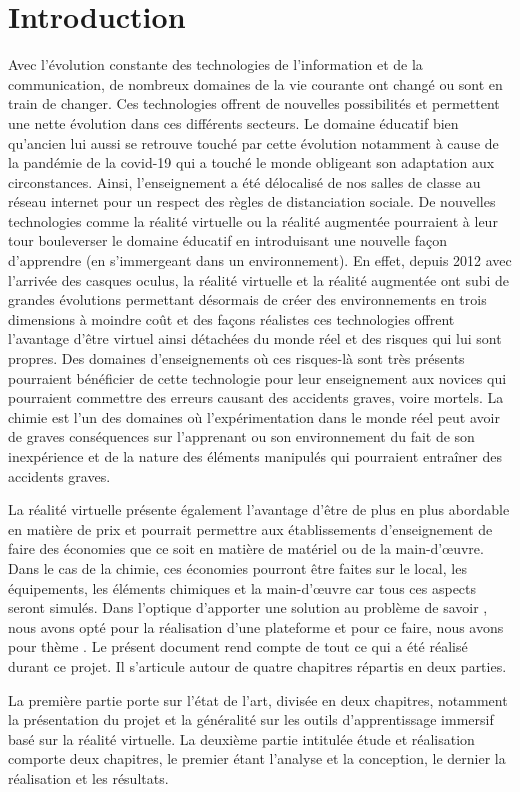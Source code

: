 \chapter*{Introduction}         %

Avec l’évolution constante des technologies de l’information et de la communication, de nombreux domaines de la vie courante ont changé ou sont en train de changer. 
Ces technologies offrent de nouvelles possibilités et permettent une nette évolution dans ces différents secteurs. 
Le domaine éducatif bien qu’ancien lui aussi se retrouve touché par cette évolution notamment à cause de la pandémie de la covid-19 qui a touché le monde obligeant son adaptation aux circonstances. 
Ainsi, l’enseignement a été délocalisé de nos salles de classe au réseau internet pour un respect des règles de distanciation sociale. 
De nouvelles technologies comme la réalité virtuelle ou la réalité augmentée pourraient à leur tour bouleverser le domaine éducatif en introduisant une nouvelle façon d’apprendre (en s’immergeant dans un environnement). 
En effet, depuis 2012 avec l’arrivée des casques oculus, la réalité virtuelle et la réalité augmentée ont subi de grandes évolutions permettant désormais de créer des environnements en trois dimensions à moindre coût et des façons réalistes ces technologies offrent l’avantage d’être virtuel ainsi détachées du monde réel et des risques qui lui sont propres. 
Des domaines d’enseignements où ces risques-là sont très présents pourraient bénéficier de cette technologie pour leur enseignement aux novices qui pourraient commettre des erreurs causant des accidents graves, voire mortels. 
La chimie est l’un des domaines où l’expérimentation dans le monde réel peut avoir de graves conséquences sur l’apprenant ou son environnement du fait de son inexpérience et de la nature des éléments manipulés qui pourraient entraîner des accidents graves.

La réalité virtuelle présente également l'avantage d'être de plus en plus abordable en matière de prix et pourrait permettre aux établissements d'enseignement de faire des économies que ce soit en matière de matériel ou de la main-d'œuvre.
Dans le cas de la chimie, ces économies pourront être faites sur le local, les équipements, les éléments chimiques et la main-d'œuvre car tous ces aspects seront simulés.
Dans l'optique d'apporter une solution au problème de savoir \og \pb \fg, nous avons opté pour la réalisation d'une plateforme et pour ce faire, nous avons pour thème \og \theme \fg.
Le présent document rend compte de tout ce qui a été réalisé durant ce projet. Il s’articule autour de quatre chapitres répartis en deux parties.

La première partie porte sur l’état de l’art, divisée en deux chapitres, notamment la présentation du projet et la généralité sur les outils d'apprentissage immersif basé sur la réalité virtuelle.
La deuxième partie intitulée étude et réalisation comporte deux chapitres, le premier étant l’analyse et la conception, le dernier la réalisation et les résultats.

